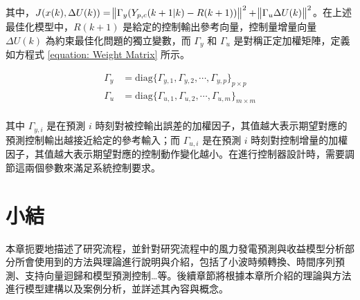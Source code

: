 其中，$J(x(k), \Delta U(k)) = \norm{\Gamma_{y} (Y_{p, c}(k+1|k)-R(k+1))}^2 + \norm{\Gamma_{u} \Delta U(k)}^2$。在上述最佳化模型中，$R(k+1)$ 是給定的控制輸出參考向量，控制量增量向量 $\Delta U(k)$ 為約束最佳化問題的獨立變數，而 $\Gamma_{y}$ 和 $\Gamma_{u}$ 是對稱正定加權矩陣，定義如方程式 \eqref{equation: Weight Matrix} 所示。

\begin{equation}\label{equation: Weight Matrix}
  \begin{aligned}
    \Gamma_{y} &= \text{diag} \{ \Gamma_{y, 1}, \Gamma_{y, 2}, \cdots, \Gamma_{y, p} \}_{p \times p} \\
    \Gamma_{u} &= \text{diag} \{ \Gamma_{u, 1}, \Gamma_{u, 2}, \cdots, \Gamma_{u, m} \}_{m \times m} \\
  \end{aligned}
\end{equation}

其中 $\Gamma_{y, i}$ 是在預測 $i$ 時刻對被控輸出誤差的加權因子，其值越大表示期望對應的預測控制輸出越接近給定的參考輸入；而 $\Gamma_{u, i}$ 是在預測 $i$ 時刻對控制增量的加權因子，其值越大表示期望對應的控制動作變化越小。在進行控制器設計時，需要調節這兩個參數來滿足系統控制要求。

\section{小結}

本章扼要地描述了研究流程，並針對研究流程中的風力發電預測與收益模型分析部分所會使用到的方法與理論進行說明與介紹，包括了小波時頻轉換、時間序列預測、支持向量迴歸和模型預測控制…等。後續章節將根據本章所介紹的理論與方法進行模型建構以及案例分析，並詳述其內容與概念。